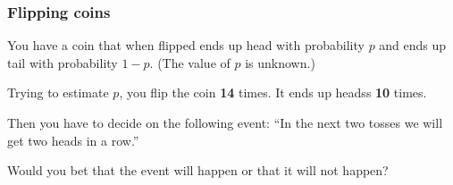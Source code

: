 \documentclass[t]{beamer}
\begin{document}
\begin{frame}

  \note{

  }
\end{frame}

\begin{frame}
  \frametitle{Flipping coins}

  You have a coin that when flipped ends up head with probability $p$
  and ends up tail with probability $1-p$. (The value of $p$ is
  unknown.)

  Trying to estimate $p$, you flip the coin \textbf{14} times. It ends
  up headss \textbf{10} times.

  Then you have to decide on the following event: ``In the next two
  tosses we will get two heads in a row.''

  Would you bet that the event will happen or that it will not happen?

  \vfill

  \note{

  }
\end{frame}
\end{document}
